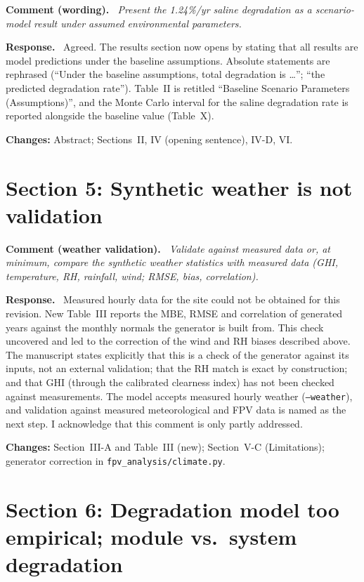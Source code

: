 \documentclass[11pt]{article}
\newcounter{cmt}
\newenvironment{comment}[1]{\refstepcounter{cmt}\par\medskip\noindent\textbf{Comment \thecmt{} (#1).}\itshape\ }{\par}
\newenvironment{response}{\par\noindent\textbf{Response.}\ }{\par}
\newcommand{\change}[1]{\par\noindent\textcolor{blue!50!black}{\textbf{Changes:} #1}\par}
\begin{document}
\begin{comment}{wording}
Present the 1.24\%/yr saline degradation as a scenario-model result under assumed environmental parameters.
\end{comment}
\begin{response}
Agreed. The results section now opens by stating that all results are model predictions under the baseline assumptions.
Absolute statements are rephrased (``Under the baseline assumptions, total degradation is \ldots''; ``the predicted
degradation rate''). Table~II is retitled ``Baseline Scenario Parameters (Assumptions)'', and the Monte Carlo interval
for the saline degradation rate is reported alongside the baseline value (Table~X).
\end{response}
\change{Abstract; Sections~II, IV (opening sentence), IV-D, VI.}

\section*{Section 5: Synthetic weather is not validation}

\begin{comment}{weather validation}
Validate against measured data or, at minimum, compare the synthetic weather statistics with measured data (GHI,
temperature, RH, rainfall, wind; RMSE, bias, correlation).
\end{comment}
\begin{response}
Measured hourly data for the site could not be obtained for this revision. New Table~III reports the MBE, RMSE and
correlation of \NSeeds{} generated years against the monthly normals the generator is built from. This check uncovered
and led to the correction of the wind and RH biases described above. The manuscript states explicitly that this is a
check of the generator against its inputs, not an external validation; that the RH match is exact by construction; and
that GHI (through the calibrated clearness index) has not been checked against measurements. The model accepts measured
hourly weather (\texttt{--weather}), and validation against measured meteorological and FPV data is named as the next
step. I acknowledge that this comment is only partly addressed.
\end{response}
\change{Section~III-A and Table~III (new); Section~V-C (Limitations); generator correction in
\texttt{fpv\_analysis/climate.py}.}

\section*{Section 6: Degradation model too empirical; module vs.\ system degradation}
\end{document}
